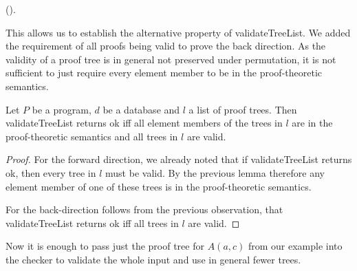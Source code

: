 (\allTreeElementsOfValidTreeInSemantics).

This allows us to establish the alternative property of validateTreeList. We added the requirement of all proofs being valid to prove the back direction. As the validity of a proof tree is in general not preserved under permutation, it is not sufficient to just require every element member to be in the proof-theoretic semantics.

\begin{lemma}[\validateTreeListUnitIffSubsetSemanticsAndAllElementsHaveValidTrees]
    Let $P$ be a program, $d$ be a database and $l$ a list of proof trees. Then validateTreeList returns ok iff all element members of the trees in $l$ are in the proof-theoretic semantics and all trees in $l$ are valid.
\end{lemma}
\begin{proof}
    For the forward direction, we already noted that if validateTreeList returns ok, then every tree in $l$ must be valid. By the previous lemma therefore any element member of one of these trees is in the proof-theoretic semantics.

    For the back-direction follows from the previous observation, that validateTreeList returns ok iff all trees in $l$ are valid.
\end{proof}

Now it is enough to pass just the proof tree for $A(a,c)$ from our example into the checker to validate the whole input and use in general fewer trees. 

